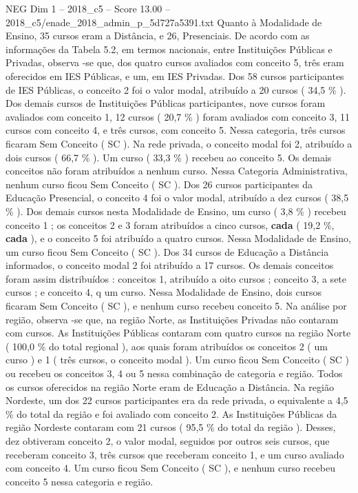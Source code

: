 \begin{textsample}{NEG Dim 1 – 2018\_c5 – Score 13.00 – 2018\_c5/enade\_2018\_admin\_p\_5d727a5391.txt}
Quanto à Modalidade de Ensino, 35 cursos eram a Distância, e 26, Presenciais.
De acordo com as informações da Tabela 5.2, em termos nacionais, entre Instituições Públicas e Privadas, observa -se que, dos quatro cursos avaliados com conceito 5, três eram oferecidos em IES Públicas, e um, em IES Privadas.
Dos 58 cursos participantes de IES Públicas, o conceito 2 foi o valor modal, atribuído a 20 cursos ( 34,5 \% ).
Dos demais cursos de Instituições Públicas participantes, nove cursos foram avaliados com conceito 1, 12 cursos ( 20,7 \% ) foram avaliados com conceito 3, 11 cursos com conceito 4, e três cursos, com conceito 5.
Nessa categoria, três cursos ficaram Sem Conceito ( SC ).
Na rede privada, o conceito modal foi 2, atribuído a dois cursos ( 66,7 \% ).
Um curso ( 33,3 \% ) recebeu ao conceito 5.
Os demais conceitos não foram atribuídos a nenhum curso.
Nessa Categoria Administrativa, nenhum curso ficou Sem Conceito ( SC ).
Dos 26 cursos participantes da Educação Presencial, o conceito 4 foi o valor modal, atribuído a dez cursos ( 38,5 \% ).
Dos demais cursos nesta Modalidade de Ensino, um curso ( 3,8 \% ) recebeu conceito 1 ; os conceitos 2 e 3 foram atribuídos a cinco cursos, \textbf{cada} ( 19,2 \%, \textbf{cada} ), e o conceito 5 foi atribuído a quatro cursos.
Nessa Modalidade de Ensino, um curso ficou Sem Conceito ( SC ).
Dos 34 cursos de Educação a Distância informados, o conceito modal 2 foi atribuído a 17 cursos.
Os demais conceitos foram assim distribuídos : conceitos 1, atribuído a oito cursos ; conceito 3, a sete cursos ; e conceito 4, q um curso.
Nessa Modalidade de Ensino, dois cursos ficaram Sem Conceito ( SC ), e nenhum curso recebeu conceito 5.
Na análise por região, observa -se que, na região Norte, as Instituições Privadas não contaram com cursos.
As Instituições Públicas contaram com quatro cursos na região Norte ( 100,0 \% do total regional ), aos quais foram atribuídos os conceitos 2 ( um curso ) e 1 ( três cursos, o conceito modal ).
Um curso ficou Sem Conceito ( SC ) ou recebeu os conceitos 3, 4 ou 5 nessa combinação de categoria e região.
Todos os cursos oferecidos na região Norte eram de Educação a Distância.
Na região Nordeste, um dos 22 cursos participantes era da rede privada, o equivalente a 4,5 \% do total da região e foi avaliado com conceito 2.
As Instituições Públicas da região Nordeste contaram com 21 cursos ( 95,5 \% do total da região ).
Desses, dez obtiveram conceito 2, o valor modal, seguidos por outros seis cursos, que receberam conceito 3, três cursos que receberam conceito 1, e um curso avaliado com conceito 4.
Um curso ficou Sem Conceito ( SC ), e nenhum curso recebeu conceito 5 nessa categoria e região.

\end{textsample}
